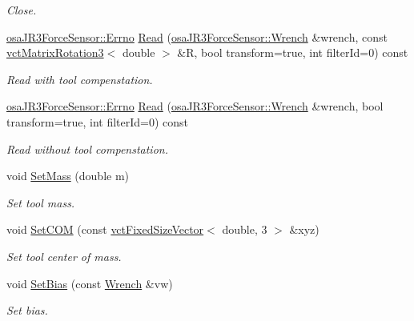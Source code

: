 \begin{DoxyCompactItemize}
\begin{DoxyCompactList}\small\item\em Close. \end{DoxyCompactList}\item 
\hyperlink{classosa_j_r3_force_sensor_a6b27d3a601fae1547fb13d2a4ef97e4a}{osa\-J\-R3\-Force\-Sensor\-::\-Errno} \hyperlink{classosa_j_r3_force_sensor_a8041232529b96e4e6c14a8d342767e12}{Read} (\hyperlink{classosa_j_r3_force_sensor_afcfc2ba175b2e7ef9f86c6394c8966d2}{osa\-J\-R3\-Force\-Sensor\-::\-Wrench} \&wrench, const \hyperlink{classvct_matrix_rotation3}{vct\-Matrix\-Rotation3}$<$ double $>$ \&R, bool transform=true, int filter\-Id=0) const 
\begin{DoxyCompactList}\small\item\em Read with tool compenstation. \end{DoxyCompactList}\item 
\hyperlink{classosa_j_r3_force_sensor_a6b27d3a601fae1547fb13d2a4ef97e4a}{osa\-J\-R3\-Force\-Sensor\-::\-Errno} \hyperlink{classosa_j_r3_force_sensor_a8069da1821ef785d814e23fada35de30}{Read} (\hyperlink{classosa_j_r3_force_sensor_afcfc2ba175b2e7ef9f86c6394c8966d2}{osa\-J\-R3\-Force\-Sensor\-::\-Wrench} \&wrench, bool transform=true, int filter\-Id=0) const 
\begin{DoxyCompactList}\small\item\em Read without tool compenstation. \end{DoxyCompactList}\item 
void \hyperlink{classosa_j_r3_force_sensor_ad80028c63a3b07cb6fea44cc69807f57}{Set\-Mass} (double m)
\begin{DoxyCompactList}\small\item\em Set tool mass. \end{DoxyCompactList}\item 
void \hyperlink{classosa_j_r3_force_sensor_adcd3aac623182a94868d24c93a7b3354}{Set\-C\-O\-M} (const \hyperlink{classvct_fixed_size_vector}{vct\-Fixed\-Size\-Vector}$<$ double, 3 $>$ \&xyz)
\begin{DoxyCompactList}\small\item\em Set tool center of mass. \end{DoxyCompactList}\item 
void \hyperlink{classosa_j_r3_force_sensor_a88981a59351ff9f5f17d14e489b0ed04}{Set\-Bias} (const \hyperlink{classosa_j_r3_force_sensor_afcfc2ba175b2e7ef9f86c6394c8966d2}{Wrench} \&vw)
\begin{DoxyCompactList}\small\item\em Set bias. \end{DoxyCompactList}\item 

\end{DoxyCompactItemize}
